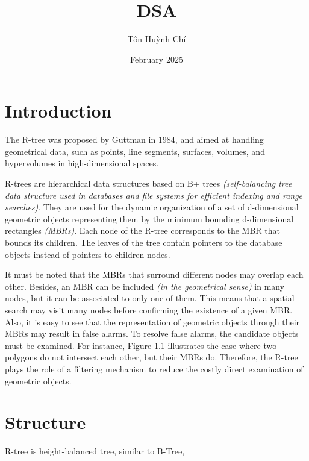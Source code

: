 \documentclass{article}
\title{DSA}
\author{Tôn Huỳnh Chí}
\date{February 2025}
\begin{document}
\maketitle

\section{Introduction} 

The R-tree was proposed by Guttman in 1984, and aimed at handling geometrical data, such as points, line segments, surfaces, volumes, and hypervolumes in high-dimensional spaces. \par
R-trees are hierarchical data structures based on B+ trees \textit{(self-balancing tree data structure used in databases and file systems for efficient indexing and range searches)}. They are used for the dynamic organization of a set of d-dimensional geometric objects representing them by the minimum bounding d-dimensional rectangles \textit{(MBRs)}. Each node of the R-tree corresponds to the MBR that bounds its children. The leaves of the tree contain pointers to the database objects instead of pointers to children nodes.\par
It must be noted that the MBRs that surround different nodes may overlap each other. Besides, an MBR can be included \textit{(in the geometrical sense)} in many nodes, but it can be associated to only one of them. This means that a spatial search may visit many nodes before confirming the existence of a given MBR. Also, it is easy to see that the representation of geometric objects through their MBRs may result in false alarms. To resolve false alarms, the candidate objects must be examined. For instance, Figure 1.1 illustrates the case where two polygons do not intersect each other, but their MBRs do. Therefore, the R-tree plays the role of a filtering mechanism to reduce the costly direct examination of geometric objects.


\section{Structure}

R-tree is height-balanced tree, similar to B-Tree, 
\end{document}
